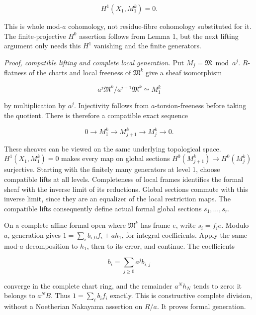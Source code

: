 \documentclass[
  11pt,
]{article}
\begin{document}
\[
 H^1(X_1,M_1^k)=0.
\]

This is whole mod-\(a\) cohomology, not residue-fibre cohomology
substituted for it. The finite-projective \(H^0\) assertion follows from
Lemma 1, but the next lifting argument only needs this \(H^1\) vanishing
and the finite generators.

\emph{Proof, compatible lifting and complete local generation.} Put
\(M_j=\mathfrak M\bmod a^j\). \(R\)-flatness of the charts and local
freeness of \(\mathfrak M^k\) give a sheaf isomorphism

\[
 a^j\mathfrak M^k/a^{j+1}\mathfrak M^k\simeq M_1^k
\]

by multiplication by \(a^j\). Injectivity follows from
\(a\)-torsion-freeness before taking the quotient. There is therefore a
compatible exact sequence

\[
0\longrightarrow M_1^k\longrightarrow M_{j+1}^k
 \longrightarrow M_j^k\longrightarrow0.
\]

These sheaves can be viewed on the same underlying topological space.
\(H^1(X_1,M_1^k)=0\) makes every map on global sections
\(H^0(M_{j+1}^k)\to H^0(M_j^k)\) surjective. Starting with the finitely
many generators at level 1, choose compatible lifts at all levels.
Completeness of local frames identifies the formal sheaf with the
inverse limit of its reductions. Global sections commute with this
inverse limit, since they are an equalizer of the local restriction
maps. The compatible lifts consequently define actual formal global
sections \(s_1,\ldots,s_r\).

On a complete affine formal open where \(\mathfrak M^k\) has frame
\(e\), write \(s_i=f_ie\). Modulo \(a\), generation gives
\(1=\sum_i b_{i,0}f_i+a h_1\), for integral coefficients. Apply the same
mod-\(a\) decomposition to \(h_1\), then to its error, and continue. The
coefficients

\[
 b_i=\sum_{j\geq0}a^j b_{i,j}
\]

converge in the complete chart ring, and the remainder \(a^Nh_N\) tends
to zero: it belongs to \(a^N B\). Thus \(1=\sum_i b_i f_i\) exactly.
This is constructive complete division, without a Noetherian Nakayama
assertion on \(R/a\). It proves formal generation.
\end{document}
